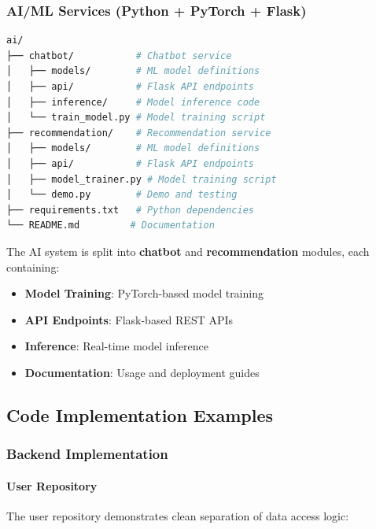 \subsubsection{AI/ML Services (Python + PyTorch + Flask)}

\begin{lstlisting}[language=bash, caption={AI/ML Services Directory Structure (tree -L 2)}]
ai/
├── chatbot/           # Chatbot service
│   ├── models/        # ML model definitions
│   ├── api/           # Flask API endpoints
│   ├── inference/     # Model inference code
│   └── train_model.py # Model training script
├── recommendation/    # Recommendation service
│   ├── models/        # ML model definitions
│   ├── api/           # Flask API endpoints
│   ├── model_trainer.py # Model training script
│   └── demo.py        # Demo and testing
├── requirements.txt   # Python dependencies
└── README.md         # Documentation
\end{lstlisting}

\begin{tcolorbox}[title=AI/ML Architecture]
The AI system is split into \textbf{chatbot} and \textbf{recommendation} modules, each containing:
\begin{itemize}
    \item \textbf{Model Training}: PyTorch-based model training
    \item \textbf{API Endpoints}: Flask-based REST APIs
    \item \textbf{Inference}: Real-time model inference
    \item \textbf{Documentation}: Usage and deployment guides
\end{itemize}
\end{tcolorbox}

\subsection{Code Implementation Examples}
\label{subsec:code_examples}

\subsubsection{Backend Implementation}
\label{subsubsec:backend_examples}

\paragraph{User Repository}
The user repository demonstrates clean separation of data access logic:

